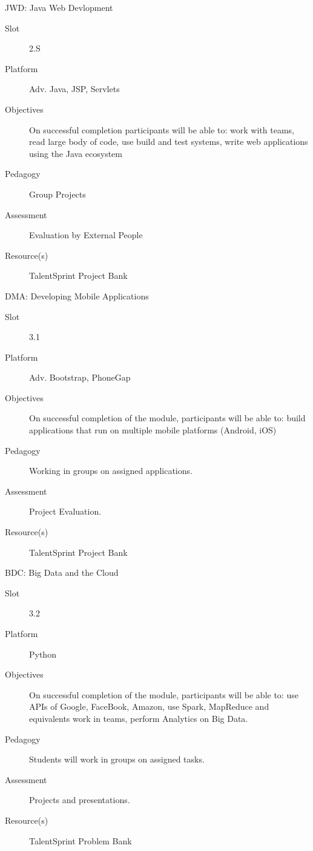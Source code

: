 \documentclass[12pt]{beamer}
\begin{document}
{\begin{frame}{JWD: Java Web Devlopment}
  \begin{description}
    \item[Slot] 2.S
  \item[Platform] Adv. Java, JSP, Servlets 
  \item[Objectives] On successful completion participants will be able to: work with teams, read large body of code, use build and test systems,  write web applications using the Java ecosystem
  \item[Pedagogy] Group Projects
  \item[Assessment] Evaluation by External People
  \item[Resource(s)] TalentSprint Project Bank
  \end{description}
\end{frame}

\begin{frame}{DMA: Developing Mobile Applications}
  \begin{description}
   \item[Slot] 3.1
  \item[Platform] Adv. Bootstrap, PhoneGap
  \item[Objectives] On successful completion of the module, participants will be able to: build applications that run on multiple mobile platforms (Android, iOS)
  \item[Pedagogy] Working in groups on assigned applications.
  \item[Assessment] Project Evaluation.
  \item[Resource(s)] TalentSprint Project Bank
  \end{description}
\end{frame}

\begin{frame}{BDC: Big Data and the Cloud}
  \begin{description}
    \item[Slot] 3.2
  \item[Platform] Python
  \item[Objectives] On successful completion of the module, participants will be able to: use APIs of Google, FaceBook, Amazon, use Spark, MapReduce and equivalents work in teams, perform Analytics on Big Data.
  \item[Pedagogy] Students will work in groups on assigned tasks.
  \item[Assessment] Projects and presentations.
  \item[Resource(s)] TalentSprint Problem Bank
  \end{description}
\end{frame}

}
\end{document}

